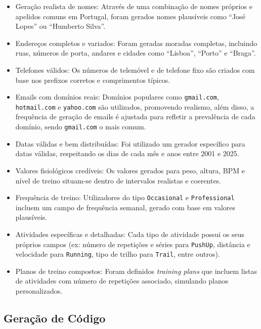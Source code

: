 \documentclass[12pt, a4paper]{article}
\begin{document}
\begin{itemize}
  \item Geração realista de nomes: Através de uma combinação de nomes próprios e apelidos comuns em
    Portugal, foram gerados nomes plausíveis como ``José Lopes'' ou ``Humberto Silva''.

  \item Endereços completos e variados: Foram geradas moradas completas, incluindo ruas, números de
    porta, andares e cidades como ``Lisboa'', ``Porto'' e ``Braga''.

  \item Telefones válidos: Os números de telemóvel e de telefone fixo são criados com base nos
    prefixos corretos e comprimentos típicos.

  \item Emails com domínios reais: Domínios populares como \texttt{gmail.com}, \texttt{hotmail.com}
    e \texttt{yahoo.com} são utilizados, promovendo realismo, além disso, a frequência de geração de
    emails é ajustada para refletir a prevalência de cada domínio, sendo \texttt{gmail.com} o mais
    comum.

  \item Datas válidas e bem distribuídas: Foi utilizado um gerador específico para datas válidas,
      respeitando os dias de cada mês e anos entre 2001 e 2025.

  \item Valores fisiológicos credíveis: Os valores gerados para peso, altura, BPM e nível de treino
    situam-se dentro de intervalos realistas e coerentes.

  \item Frequência de treino: Utilizadores do tipo \texttt{Occasional} e \texttt{Professional}
    incluem um campo de frequência semanal, gerado com base em valores plausíveis.

  \item Atividades específicas e detalhadas: Cada tipo de atividade possui os seus próprios campos
    (ex: número de repetições e séries para \texttt{PushUp}, distância e velocidade para
    \texttt{Running}, tipo de trilho para \texttt{Trail}, entre outros).

  \item Planos de treino compostos: Foram definidos \emph{training plans} que incluem listas de
    atividades com número de repetições associado, simulando planos personalizados.
\end{itemize}

\subsection{Geração de Código}
\end{document}
